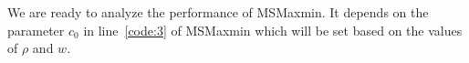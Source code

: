 \documentclass[11pt,a4paper]{article}
\renewcommand{\geq}{\geqslant}
\begin{document}

We are ready to analyze the performance of MSMaxmin.  It depends on the parameter $c_0$ in line~\ref{code:3} of MSMaxmin which will be set based on the values of $\rho$ and $w$.
\end{document}

